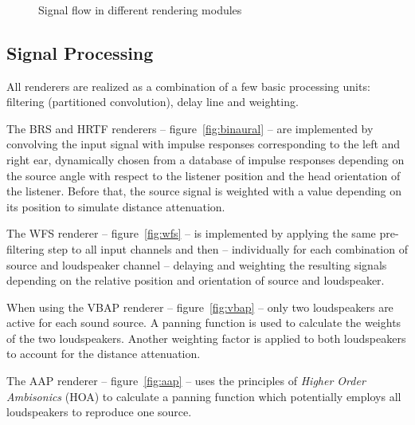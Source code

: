 \documentclass[a4paper]{article}
\begin{document}
\begin{figure}[tb]
\begin{center}
\\[\baselineskip]
\\[\baselineskip]
\\[\baselineskip]
\end{center}
\caption{Signal flow in different rendering modules}
\end{figure}

\subsection{Signal Processing}

All renderers are realized as a combination of a few basic processing units:
filtering (partitioned convolution), delay line and weighting.

The BRS and HRTF renderers -- figure~\ref{fig:binaural} -- are implemented
by convolving the input signal with impulse
responses corresponding to the left and right ear, dynamically chosen from a
database of impulse responses depending on the source angle with respect to the
listener position and
the head orientation of the listener. Before that, the source signal is
weighted with a value depending on its position to simulate distance
attenuation.

The WFS renderer -- figure~\ref{fig:wfs} -- is implemented by applying the
same pre-filtering
step to all input channels and then -- individually for each combination of
source and loudspeaker channel -- delaying and weighting the resulting signals
depending on the relative position and orientation of source and loudspeaker.

When using the VBAP renderer -- figure~\ref{fig:vbap} -- only two loudspeakers
are active for each sound source. A panning function is used to calculate the
weights of the two loudspeakers. Another weighting factor is applied to both
loudspeakers to account for the distance attenuation.

The AAP renderer -- figure~\ref{fig:aap} -- uses the principles of
\emph{Higher Order Ambisonics} (HOA) to calculate a panning function which
potentially employs all loudspeakers to reproduce one source.
\end{document}
